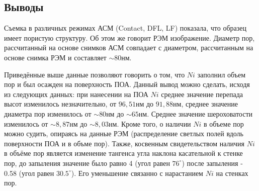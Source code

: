 \subsection{Выводы}

Съемка в различных режимах АСМ (Contact, DFL, LF) показала, что образец имеет пористую структуру. Об этом же говорит РЭМ изображение. Диаметр пор, рассчитанный на основе снимков АСМ совпадает с диаметром, рассчитанным на основе снимка РЭМ и составляет $\sim 80 \text{нм}$.

Приведённые выше данные позволяют говорить о том, что $Ni$ заполнил объем пор и был осажден на поверхность ПОА. Данный вывод можно сделать, исходя из следующих данных: при нанесении на ПОА $Ni$ среднее значение перепада высот изменилось незначительно, от $96,51 \text{нм}$ до $91,88 \text{нм}$, среднее значение диаметра пор изменилось от $\sim 80\text{нм}$ до $\sim 65\text{нм}$. Среднее значение шероховатости изменилось от $\sim 8,87\text{нм}$ до $\sim 8,03\text{нм}$. Кроме того, о наличии $Ni$ в объеме пор можно судить, опираясь на данные РЭМ (распределение светлых полей вдоль поверхности ПОА и в объме пор). Также, косвенным свидетельством наличия $Ni$ в объёме пор является изменение тангенса угла наклона касательной к стенке пор, до запыления значение было равно 4 (угол равен $76^{\circ}$) после запыления - 0.58 (угол равен $30.5^{\circ}$). Его уменьшение связанно с нарастанием $Ni$ на стенках пор.

\clearpage
